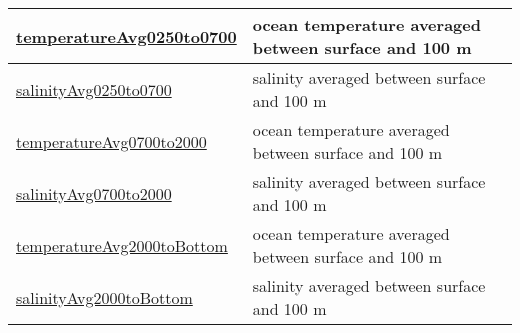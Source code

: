 {\begin{center}
\begin{longtable}{| p{2.0in} | p{4.0in} |}
    \hline
    \hyperref[subsec:var_sec_highFrequencyOutputAM_temperatureAvg0250to0700]{temperatureAvg0250to0700} & ocean temperature averaged between surface and 100 m \\
    \hline
    \hyperref[subsec:var_sec_highFrequencyOutputAM_salinityAvg0250to0700]{salinityAvg0250to0700} & salinity averaged between surface and 100 m \\
    \hline
    \hyperref[subsec:var_sec_highFrequencyOutputAM_temperatureAvg0700to2000]{temperatureAvg0700to2000} & ocean temperature averaged between surface and 100 m \\
    \hline
    \hyperref[subsec:var_sec_highFrequencyOutputAM_salinityAvg0700to2000]{salinityAvg0700to2000} & salinity averaged between surface and 100 m \\
    \hline
    \hyperref[subsec:var_sec_highFrequencyOutputAM_temperatureAvg2000toBottom]{temperatureAvg2000toBottom} & ocean temperature averaged between surface and 100 m \\
    \hline
    \hyperref[subsec:var_sec_highFrequencyOutputAM_salinityAvg2000toBottom]{salinityAvg2000toBottom} & salinity averaged between surface and 100 m \\
    \hline
\end{longtable}
\end{center}
}
